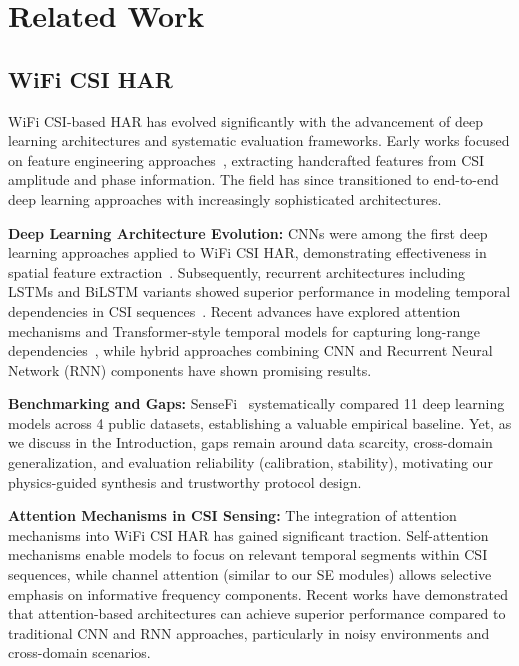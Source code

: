 \documentclass[journal]{IEEEtran}
\begin{document}
\section{Related Work}

\subsection{WiFi CSI HAR}

WiFi CSI-based HAR has evolved significantly with the advancement of deep learning architectures and systematic evaluation frameworks. Early works focused on feature engineering approaches~\cite{csi_basics2016}, extracting handcrafted features from CSI amplitude and phase information. The field has since transitioned to end-to-end deep learning approaches with increasingly sophisticated architectures.

\textbf{Deep Learning Architecture Evolution:} CNNs were among the first deep learning approaches applied to WiFi CSI HAR, demonstrating effectiveness in spatial feature extraction~\cite{clnet2021}. Subsequently, recurrent architectures including LSTMs and BiLSTM variants showed superior performance in modeling temporal dependencies in CSI sequences~\cite{rewis2022}. Recent advances have explored attention mechanisms and Transformer-style temporal models for capturing long-range dependencies~\cite{gulati2020conformer,li2020tea,bertasius2021timesformer,lim2021tft,zhou2021informer}, while hybrid approaches combining CNN and Recurrent Neural Network (RNN) components have shown promising results.

\textbf{Benchmarking and Gaps:} SenseFi~\cite{yang2023sensefi} systematically compared 11 deep learning models across 4 public datasets, establishing a valuable empirical baseline. Yet, as we discuss in the Introduction, gaps remain around data scarcity, cross-domain generalization, and evaluation reliability (calibration, stability), motivating our physics-guided synthesis and trustworthy protocol design.

\textbf{Attention Mechanisms in CSI Sensing:} The integration of attention mechanisms into WiFi CSI HAR has gained significant traction. Self-attention mechanisms enable models to focus on relevant temporal segments within CSI sequences, while channel attention (similar to our SE modules) allows selective emphasis on informative frequency components. Recent works have demonstrated that attention-based architectures can achieve superior performance compared to traditional CNN and RNN approaches, particularly in noisy environments and cross-domain scenarios.
\end{document}
